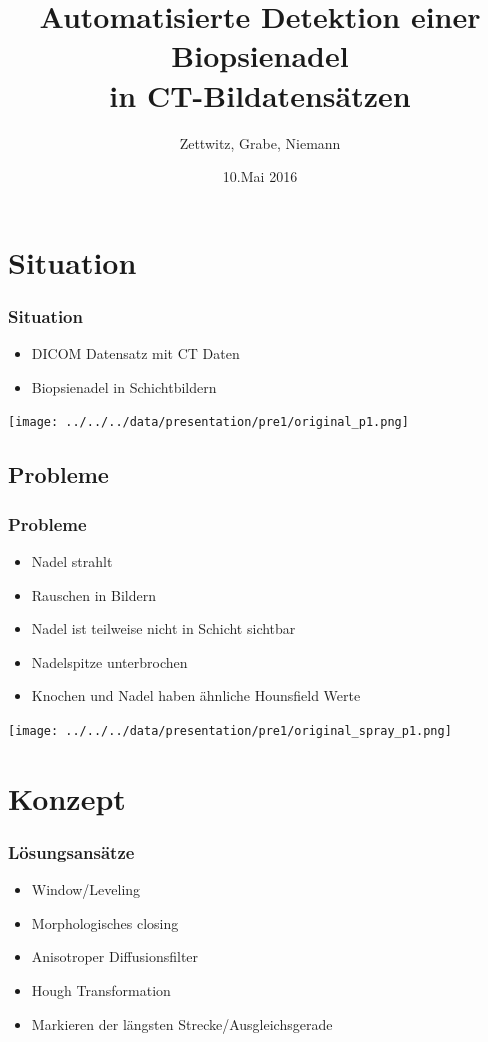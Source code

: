 \documentclass[11pt]{beamer}
\author{Zettwitz, Grabe, Niemann}
\title{Automatisierte Detektion einer Biopsienadel \\ in CT-Bildatensätzen}
\date{10.Mai 2016}
\begin{document}
\begin{frame}
\titlepage
\end{frame}


\section{Situation}
\begin{frame}
\frametitle{Situation}
\begin{itemize} 
\item DICOM Datensatz mit CT Daten
\item Biopsienadel in Schichtbildern
\end{itemize}
\texttt{[image: ../../../data/presentation/pre1/original\_p1.png]} 
\end{frame}


\subsection{Probleme}
\begin{frame}
\frametitle{Probleme}
\begin{itemize}
\item Nadel strahlt
\item Rauschen in Bildern
\item Nadel ist teilweise nicht in Schicht sichtbar
\item Nadelspitze unterbrochen
\item Knochen und Nadel haben ähnliche Hounsfield Werte
\end{itemize}
\texttt{[image: ../../../data/presentation/pre1/original\_spray\_p1.png]}
\end{frame}

\section{Konzept}
\begin{frame}
\frametitle{Lösungsansätze}
\begin{itemize}
\item Window/Leveling
\item Morphologisches closing
\item Anisotroper Diffusionsfilter
\item Hough Transformation
\item Markieren der längsten Strecke/Ausgleichsgerade
\end{itemize}
\end{frame}
\end{document}
